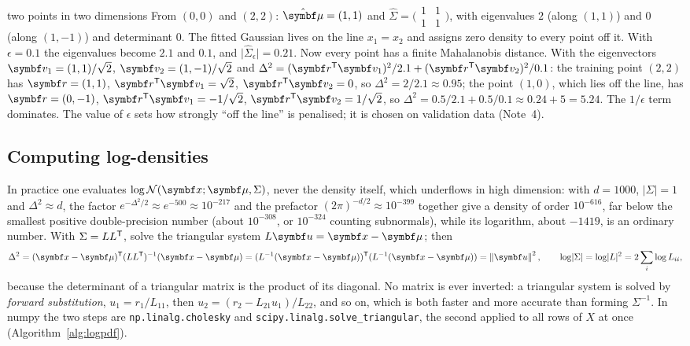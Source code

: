 \documentclass[11pt]{article}
\begin{document}
\begin{worked}{two points in two dimensions}
From $(0, 0)$ and $(2, 2)$: $\hat{\vmu} = (1, 1)$ and $\hat\Sigma = \bigl(\begin{smallmatrix} 1 & 1 \\ 1 & 1\end{smallmatrix}\bigr)$,
with eigenvalues $2$ (along $(1,1)$) and $0$ (along $(1,-1)$) and determinant $0$. The fitted Gaussian lives on the
line $x_1 = x_2$ and assigns zero density to every point off it. With $\epsilon = 0.1$ the eigenvalues become $2.1$
and $0.1$, and $\lvert\hat\Sigma_\epsilon\rvert = 0.21$. Now every point has a finite Mahalanobis distance. With the
eigenvectors $\vect{v}_1 = (1, 1)/\sqrt2$, $\vect{v}_2 = (1, -1)/\sqrt2$ and $\Delta^2 = (\vect{r}\T\vect{v}_1)^2/2.1 +
(\vect{r}\T\vect{v}_2)^2/0.1$: the training point $(2, 2)$ has $\vect{r} = (1, 1)$, $\vect{r}\T\vect{v}_1 = \sqrt2$,
$\vect{r}\T\vect{v}_2 = 0$, so $\Delta^2 = 2/2.1 \approx 0.95$; the point $(1, 0)$, which lies off the line, has
$\vect{r} = (0, -1)$, $\vect{r}\T\vect{v}_1 = -1/\sqrt2$, $\vect{r}\T\vect{v}_2 = 1/\sqrt2$, so $\Delta^2 = 0.5/2.1 + 0.5/0.1
\approx 0.24 + 5 = 5.24$. The $1/\epsilon$ term dominates. The value of
$\epsilon$ sets how strongly ``off the line'' is penalised; it is chosen on validation data (Note~4).
\end{worked}

\subsection{Computing log-densities}\label{sec:logpdf}

In practice one evaluates $\log \Normal(\x; \vmu, \Sigma)$, never the density itself, which underflows in high
dimension: with $d = 1000$, $\lvert\Sigma\rvert = 1$ and $\Delta^2 \approx d$, the factor $e^{-\Delta^2/2} \approx
e^{-500} \approx 10^{-217}$ and the prefactor $(2\pi)^{-d/2} \approx 10^{-399}$ together give a density of order
$10^{-616}$, far below the smallest positive double-precision number (about $10^{-308}$, or $10^{-324}$ counting
subnormals), while its logarithm, about $-1419$, is an ordinary number. With $\Sigma = LL^{\mathsf{T}}$, solve the triangular system $L\vect{u} = \x - \vmu$; then
\[
  \Delta^2 = (\x - \vmu)\T(LL\T)^{-1}(\x - \vmu) = (L^{-1}(\x - \vmu))\T(L^{-1}(\x - \vmu)) = \norm{\vect{u}}^2,
  \qquad \log\lvert\Sigma\rvert = \log\lvert L\rvert^2 = 2\sum_i \log L_{ii},
\]
because the determinant of a triangular matrix is the product of its diagonal. No matrix is ever inverted: a
triangular system is solved by \emph{forward substitution}, $u_1 = r_1/L_{11}$, then $u_2 = (r_2 - L_{21}u_1)/L_{22}$,
and so on, which is both faster and more accurate than forming $\Sigma^{-1}$. In numpy the two steps are
\texttt{np.linalg.cholesky} and \texttt{scipy.linalg.solve\_triangular}, the second applied to all rows of $X$ at
once (Algorithm~\ref{alg:logpdf}).
\end{document}
